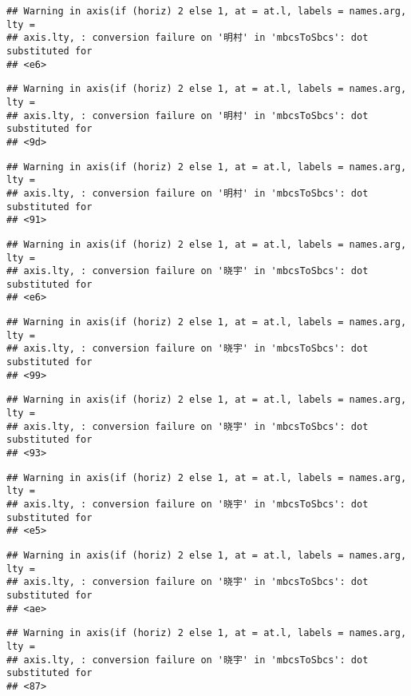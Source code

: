 \documentclass[
]{article}
\begin{document}
\begin{verbatim}
## Warning in axis(if (horiz) 2 else 1, at = at.l, labels = names.arg, lty =
## axis.lty, : conversion failure on '明村' in 'mbcsToSbcs': dot substituted for
## <e6>
\end{verbatim}

\begin{verbatim}
## Warning in axis(if (horiz) 2 else 1, at = at.l, labels = names.arg, lty =
## axis.lty, : conversion failure on '明村' in 'mbcsToSbcs': dot substituted for
## <9d>
\end{verbatim}

\begin{verbatim}
## Warning in axis(if (horiz) 2 else 1, at = at.l, labels = names.arg, lty =
## axis.lty, : conversion failure on '明村' in 'mbcsToSbcs': dot substituted for
## <91>
\end{verbatim}

\begin{verbatim}
## Warning in axis(if (horiz) 2 else 1, at = at.l, labels = names.arg, lty =
## axis.lty, : conversion failure on '晓宇' in 'mbcsToSbcs': dot substituted for
## <e6>
\end{verbatim}

\begin{verbatim}
## Warning in axis(if (horiz) 2 else 1, at = at.l, labels = names.arg, lty =
## axis.lty, : conversion failure on '晓宇' in 'mbcsToSbcs': dot substituted for
## <99>
\end{verbatim}

\begin{verbatim}
## Warning in axis(if (horiz) 2 else 1, at = at.l, labels = names.arg, lty =
## axis.lty, : conversion failure on '晓宇' in 'mbcsToSbcs': dot substituted for
## <93>
\end{verbatim}

\begin{verbatim}
## Warning in axis(if (horiz) 2 else 1, at = at.l, labels = names.arg, lty =
## axis.lty, : conversion failure on '晓宇' in 'mbcsToSbcs': dot substituted for
## <e5>
\end{verbatim}

\begin{verbatim}
## Warning in axis(if (horiz) 2 else 1, at = at.l, labels = names.arg, lty =
## axis.lty, : conversion failure on '晓宇' in 'mbcsToSbcs': dot substituted for
## <ae>
\end{verbatim}

\begin{verbatim}
## Warning in axis(if (horiz) 2 else 1, at = at.l, labels = names.arg, lty =
## axis.lty, : conversion failure on '晓宇' in 'mbcsToSbcs': dot substituted for
## <87>
\end{verbatim}
\end{document}
